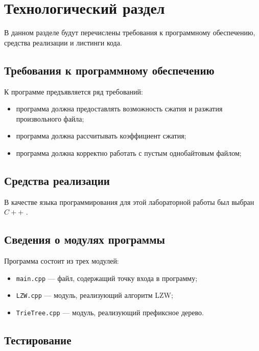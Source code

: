 \chapter{Технологический раздел}

В данном разделе будут перечислены требования к программному обеспечению, средства реализации и листинги кода.

\section{Требования к программному обеспечению}

К программе предъявляется ряд требований:

\begin{itemize}
	\item программа должна предоставлять возможность сжатия и разжатия произвольного файла;
	\item программа должна рассчитывать коэффициент сжатия;
	\item программа должна корректно работать с пустым однобайтовым файлом;
\end{itemize}

\section{Средства реализации}

В качестве языка программирования для этой лабораторной работы был выбран $C++$ \cite{pl}.

\section{Сведения о модулях программы}

Программа состоит из трех модулей: 

\begin{itemize}
	\item \texttt{main.cpp} --- файл, содержащий точку входа в программу;
	\item \texttt{LZW.cpp} --- модуль, реализующий алгоритм LZW;
	\item \texttt{TrieTree.cpp} --- модуль, реализующий префиксное дерево.
\end{itemize}

\section{Тестирование}

